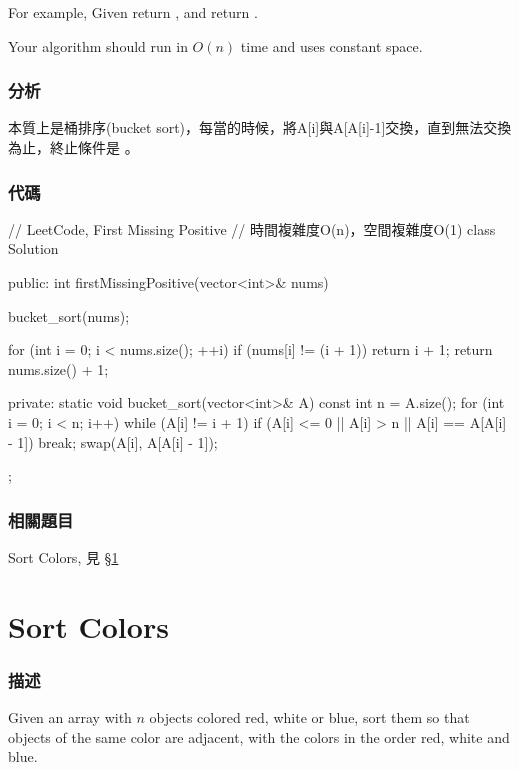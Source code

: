 For example,
Given \fn{[1,2,0]} return ,
and \fn{[3,4,-1,1]} return .

Your algorithm should run in $O(n)$ time and uses constant space.


\subsubsection{分析}
本質上是桶排序(bucket sort)，每當的時候，將A[i]與A[A[i]-1]交換，直到無法交換為止，終止條件是 。


\subsubsection{代碼}
\begin{Code}
// LeetCode, First Missing Positive
// 時間複雜度O(n)，空間複雜度O(1)
class Solution {
public:
    int firstMissingPositive(vector<int>& nums) {
        bucket_sort(nums);

        for (int i = 0; i < nums.size(); ++i)
            if (nums[i] != (i + 1))
                return i + 1;
        return nums.size() + 1;
    }
private:
    static void bucket_sort(vector<int>& A) {
        const int n = A.size();
        for (int i = 0; i < n; i++) {
            while (A[i] != i + 1) {
                if (A[i] <= 0 || A[i] > n || A[i] == A[A[i] - 1])
                    break;
                swap(A[i], A[A[i] - 1]);
            }
        }
    }
};
\end{Code}


\subsubsection{相關題目}
\begindot
\item Sort Colors, 見 \S \ref{sec:sort-colors}
\myenddot


\section{Sort Colors} %
\label{sec:sort-colors}


\subsubsection{描述}
Given an array with $n$ objects colored red, white or blue, sort them so that objects of the same color are adjacent, with the colors in the order red, white and blue.

